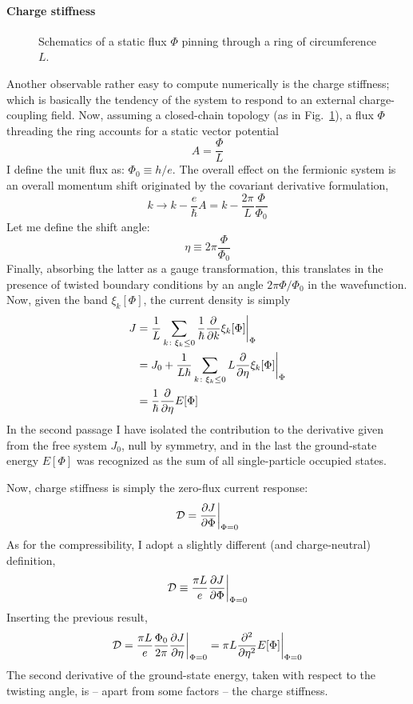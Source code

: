 \paragraph{Charge stiffness}

\begin{figure}
	\centering
	
	\caption{Schematics of a static flux $\Phi$ pinning through a ring of circumference $L$.}
	\label{fig:flux-through-ring}
\end{figure}

Another observable rather easy to compute numerically is the charge stiffness; which is basically the tendency of the system to respond to an external charge-coupling field. Now, assuming a closed-chain topology (as in Fig.~\ref{fig:flux-through-ring}), a flux $\Phi$ threading the ring accounts for a static vector potential
\[
	A = \frac{\Phi}{L}
\]
I define the unit flux as:	$\Phi_0 \equiv h/e$. The overall effect on the fermionic system is an overall momentum shift originated by the covariant derivative formulation,
\[
	k \to k - \frac{e}{\hbar} A = k - \frac{2\pi}{L} \frac{\Phi}{\Phi_0}
\]
Let me define the shift angle:
\[
	\eta \equiv 2\pi \frac{\Phi}{\Phi_0}
\]
Finally, absorbing the latter as a gauge transformation, this translates in the presence of twisted boundary conditions by an angle $2\pi \Phi/\Phi_0$ in the wavefunction. Now, given the band $\xi_k[\Phi]$, the current density is simply
\[
	\begin{aligned}
		J &= \frac{1}{L} \sum_{k \colon \xi_k \le 0} \frac{1}{\hbar} \pdv{}{k} \xi_k[\Phi] \bigg|_\Phi \\
		&= J_0 +  \frac{1}{L\hbar} \sum_{k \colon \xi_k \le 0} L \pdv{}{\eta} \xi_k[\Phi] \bigg|_\Phi \\
		&= \frac{1}{\hbar} \pdv{\eta} E[\Phi]
	\end{aligned}
\]
In the second passage I have isolated the contribution to the derivative given from the free system $J_0$, null by symmetry, and in the last the ground-state energy $E[\Phi]$ was recognized as the sum of all single-particle occupied states.

Now, charge stiffness is simply the zero-flux current response:
\[
	\mathcal{D} = \pdv{J}{\Phi} \bigg|_{\Phi=0}
\]
As for the compressibility, I adopt a slightly different (and charge-neutral) definition,
\begin{equation}\label{eq:charge-stiffness-definition}
	\mathcal{D} \equiv \frac{\pi L}{e} \pdv{J}{\Phi} \bigg|_{\Phi=0}
\end{equation}
Inserting the previous result,
\[
	\mathcal{D} = \frac{\pi L}{e} \frac{\Phi_0}{2\pi} \pdv{J}{\eta} \bigg|_{\Phi=0} = \pi L \pdv[2]{\eta} E[\Phi] \bigg|_{\Phi=0}
\]
The second derivative of the ground-state energy, taken with respect to the twisting angle, is -- apart from some factors -- the charge stiffness.

